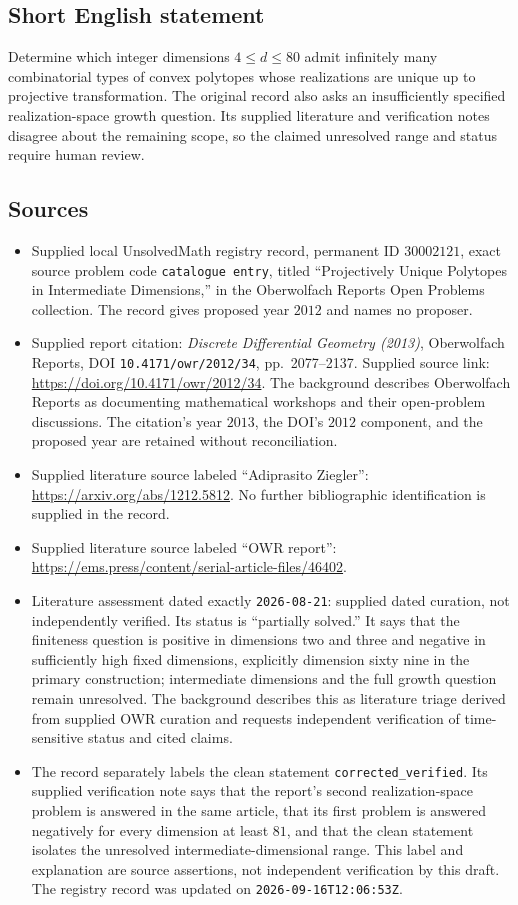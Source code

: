 \documentclass[11pt]{article}
\begin{document}
\subsection{Short English statement}
Determine which integer dimensions \(4\le d\le80\) admit infinitely many combinatorial types of convex polytopes whose realizations are unique up to projective transformation. The original record also asks an insufficiently specified realization-space growth question. Its supplied literature and verification notes disagree about the remaining scope, so the claimed unresolved range and status require human review.
\subsection{Sources}
\begin{itemize}
\item Supplied local UnsolvedMath registry record, permanent ID \(30002121\), exact source problem code \texttt{catalogue entry}, titled ``Projectively Unique Polytopes in Intermediate Dimensions,'' in the Oberwolfach Reports Open Problems collection. The record gives proposed year \(2012\) and names no proposer.
\item Supplied report citation: \emph{Discrete Differential Geometry (2013)}, Oberwolfach Reports, DOI \texttt{10.4171/owr/2012/34}, pp.\ 2077--2137. Supplied source link: \url{https://doi.org/10.4171/owr/2012/34}. The background describes Oberwolfach Reports as documenting mathematical workshops and their open-problem discussions. The citation's year \(2013\), the DOI's \(2012\) component, and the proposed year are retained without reconciliation.
\item Supplied literature source labeled ``Adiprasito Ziegler'': \url{https://arxiv.org/abs/1212.5812}. No further bibliographic identification is supplied in the record.
\item Supplied literature source labeled ``OWR report'': \url{https://ems.press/content/serial-article-files/46402}.
\item Literature assessment dated exactly \texttt{2026-08-21}: supplied dated curation, not independently verified. Its status is ``partially solved.'' It says that the finiteness question is positive in dimensions two and three and negative in sufficiently high fixed dimensions, explicitly dimension sixty nine in the primary construction; intermediate dimensions and the full growth question remain unresolved. The background describes this as literature triage derived from supplied OWR curation and requests independent verification of time-sensitive status and cited claims.
\item The record separately labels the clean statement \texttt{corrected\_verified}. Its supplied verification note says that the report's second realization-space problem is answered in the same article, that its first problem is answered negatively for every dimension at least \(81\), and that the clean statement isolates the unresolved intermediate-dimensional range. This label and explanation are source assertions, not independent verification by this draft. The registry record was updated on \texttt{2026-09-16T12:06:53Z}.
\end{itemize}
\end{document}
